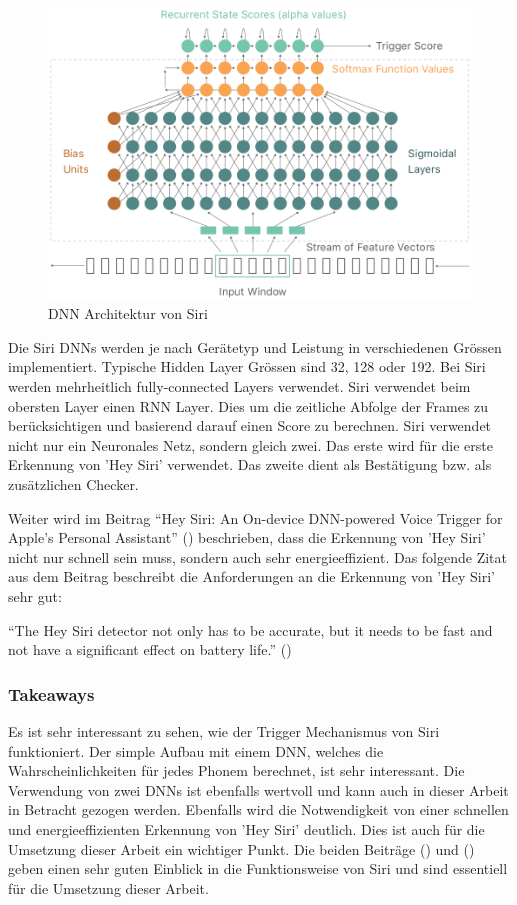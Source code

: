 \documentclass[11pt,a4paper]{article}
\begin{document}
\begin{figure}[h]
	\centering
	\includegraphics[width=0.75\linewidth]{img/siri_dnn.png}
	\caption{DNN Architektur von Siri}
	\label{fig:siri_dnn}
\end{figure}

\noindent
Die Siri DNNs werden je nach Gerätetyp und Leistung in verschiedenen Grössen implementiert.
Typische Hidden Layer Grössen sind 32, 128 oder 192. Bei Siri werden mehrheitlich fully-connected
Layers verwendet. Siri verwendet beim obersten Layer einen RNN Layer. Dies um die zeitliche
Abfolge der Frames zu berücksichtigen und basierend darauf einen Score zu berechnen. Siri verwendet
nicht nur ein Neuronales Netz, sondern gleich zwei. Das erste wird für die erste Erkennung von
'Hey Siri' verwendet. Das zweite dient als Bestätigung bzw. als zusätzlichen Checker.

\noindent \newline
Weiter wird im Beitrag ``Hey Siri: An On-device DNN-powered Voice Trigger for Apple’s Personal
Assistant'' (\cite{siri2017hey}) beschrieben, dass die Erkennung von 'Hey Siri' nicht nur schnell sein
muss, sondern auch sehr energieeffizient. Das folgende Zitat aus dem Beitrag beschreibt die
Anforderungen an die Erkennung von 'Hey Siri' sehr gut:

\begin{displayquote}
	``The Hey Siri detector not only has to be accurate, but it needs to be fast
	and not have a significant effect on battery life.''  (\cite{siri2017hey})
\end{displayquote}

\subsubsection{Takeaways}
Es ist sehr interessant zu sehen, wie der Trigger Mechanismus von Siri funktioniert. Der simple
Aufbau mit einem DNN, welches die Wahrscheinlichkeiten für jedes Phonem berechnet, ist sehr
interessant. Die Verwendung von zwei DNNs ist ebenfalls wertvoll und kann auch in dieser Arbeit
in Betracht gezogen werden. Ebenfalls wird die Notwendigkeit von einer schnellen und
energieeffizienten Erkennung von 'Hey Siri' deutlich. Dies ist auch für die Umsetzung dieser Arbeit
ein wichtiger Punkt. Die beiden Beiträge (\cite{siri2017hey}) und (\cite{apple2023voice}) geben
einen sehr guten Einblick in die Funktionsweise von Siri und sind essentiell für die Umsetzung
dieser Arbeit.
\end{document}
